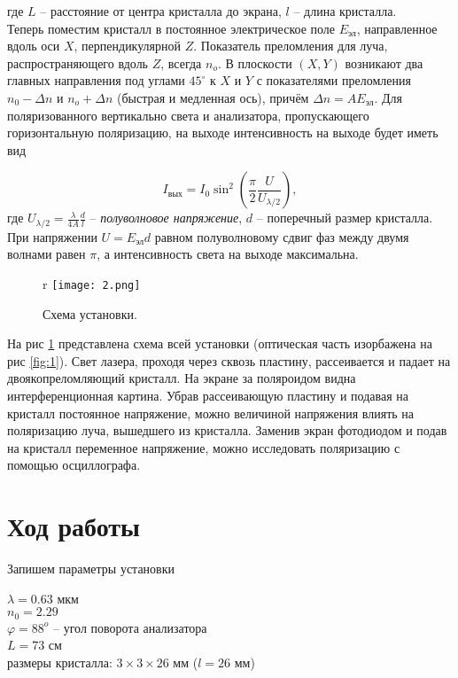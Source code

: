 где $L$ -- расстояние от центра кристалла до экрана, $l$ -- длина кристалла.\\
Теперь поместим кристалл в постоянное электрическое поле $E_{\text{эл}}$, направленное вдоль оси $X$, перпендикулярной $Z$. Показатель преломления для луча, распространяющего вдоль $Z$, всегда $n_o$. В плоскости $(X,Y)$ возникают два главных направления под углами $45^\circ$ к $X$ и $Y$ с показателями преломления $n_0 - \Delta n$ и $n_o + \Delta n$ (быстрая и медленная ось), причём $\Delta n = A E_{\text{эл}}$. Для поляризованного вертикально света и анализатора, пропускающего горизонтальную поляризацию, на выходе интенсивность на выходе будет иметь вид

\begin{equation}
I_{\text{вых}} = I_0 \sin^2 \left(\dfrac{\pi}{2} \dfrac{U}{U_{\lambda/2}} \right),
\end{equation}
где $U_{\lambda/2} = \frac{\lambda}{4A}\frac{d}{l}$ -- \textit{полуволновое напряжение}, $d$ -- поперечный размер кристалла.  При напряжении $U = E_{\text{эл}}d$ равном полуволновому сдвиг фаз между двумя волнами равен $\pi$, а интенсивность света на выходе максимальна. 


\begin{figure}{r}
	\centering
	\texttt{[image: 2.png]}
	\caption{Схема установки.}
	\label{fig:scheme}
\end{figure}

На рис \ref{fig:scheme} представлена схема всей установки (оптическая часть изорбажена на рис \ref{fig:1}). Свет лазера, проходя через сквозь пластину, рассеивается и падает на двоякопреломляющий кристалл. На экране за поляроидом видна интерференционная картина. Убрав рассеивающую пластину и подавая на кристалл постоянное напряжение, можно величиной напряжения влиять на поляризацию луча, вышедшего из кристалла. Заменив экран фотодиодом и подав на кристалл переменное напряжение, можно исследовать поляризацию с помощью осциллографа.

\section*{Ход работы}

Запишем параметры установки

\begin{center}
	$\lambda = 0.63$ мкм \\
	$n_0 = 2.29$ \\
	$\varphi = 88^o$ -- угол поворота анализатора \\
	$L = 73$ см \\
	размеры кристалла: $3 \times 3 \times 26$ мм ($l = 26$ мм)\\
\end{center}

